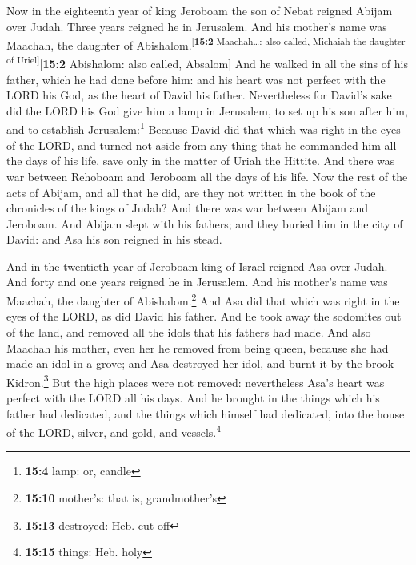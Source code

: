  Now in the eighteenth year of king Jeroboam the son of
Nebat reigned Abijam over Judah.  Three years reigned he
in Jerusalem. And his mother's name was Maachah, the daughter of
Abishalom.\textsuperscript{{[}\textbf{15:2} Maachah\ldots: also called,
Michaiah the daughter of Uriel{]}}{[}\textbf{15:2} Abishalom: also
called, Absalom{]}  And he walked in all the sins of his
father, which he had done before him: and his heart was not perfect with
the LORD his God, as the heart of David his father. 
Nevertheless for David's sake did the LORD his God give him a lamp in
Jerusalem, to set up his son after him, and to establish
Jerusalem:\footnote{\textbf{15:4} lamp: or, candle} 
Because David did that which was right in the eyes of the LORD, and
turned not aside from any thing that he commanded him all the days of
his life, save only in the matter of Uriah the Hittite. 
And there was war between Rehoboam and Jeroboam all the days of his
life.  Now the rest of the acts of Abijam, and all that he
did, are they not written in the book of the chronicles of the kings of
Judah? And there was war between Abijam and Jeroboam.  And
Abijam slept with his fathers; and they buried him in the city of David:
and Asa his son reigned in his stead.

 And in the twentieth year of Jeroboam king of Israel
reigned Asa over Judah.  And forty and one years reigned
he in Jerusalem. And his mother's name was Maachah, the daughter of
Abishalom.\footnote{\textbf{15:10} mother's: that is, grandmother's}
 And Asa did that which was right in the eyes of the
LORD, as did David his father.  And he took away the
sodomites out of the land, and removed all the idols that his fathers
had made.  And also Maachah his mother, even her he
removed from being queen, because she had made an idol in a grove; and
Asa destroyed her idol, and burnt it by the brook Kidron.\footnote{\textbf{15:13}
  destroyed: Heb. cut off}  But the high places were not
removed: nevertheless Asa's heart was perfect with the LORD all his
days.  And he brought in the things which his father had
dedicated, and the things which himself had dedicated, into the house of
the LORD, silver, and gold, and vessels.\footnote{\textbf{15:15} things:
  Heb. holy}

